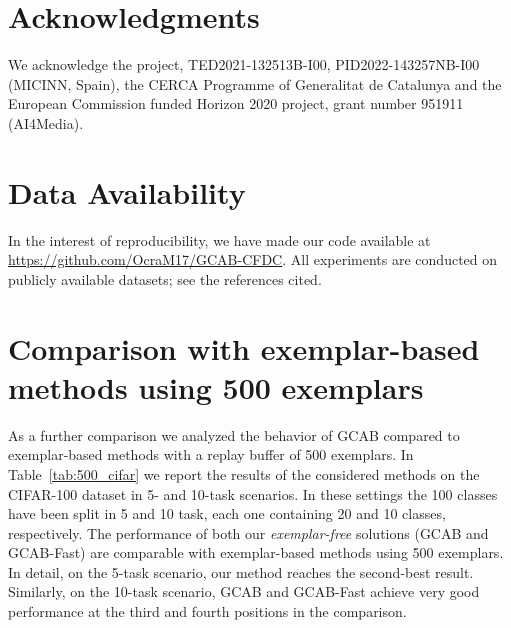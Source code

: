 \documentclass[twocolumn]{svjour3}          %
\begin{document}
\section*{Acknowledgments}
We acknowledge the project, TED2021-132513B-I00, PID2022-143257NB-I00 (MICINN, Spain), the CERCA Programme of Generalitat de Catalunya and the European Commission funded Horizon 2020 project, grant number 951911 (AI4Media). 

\section*{Data Availability}
In the interest of reproducibility, we have made our code available at \url{https://github.com/OcraM17/GCAB-CFDC}. All experiments are conducted on publicly available datasets; see the references cited.


%


\appendix


\section{Comparison with exemplar-based methods using 500 exemplars}
As a further comparison we analyzed the behavior of GCAB compared to exemplar-based methods with a replay buffer of 500 exemplars. In Table~\ref{tab:500_cifar} we report the results of the considered methods on the CIFAR-100 dataset in 5- and 10-task scenarios. In these settings the 100 classes have been split in 5 and 10 task, each one containing  20 and 10 classes, respectively. The performance of both our \textit{exemplar-free} solutions (GCAB and GCAB-Fast) are comparable with exemplar-based methods using 500 exemplars. In detail, on the 5-task scenario, our method reaches the second-best result. Similarly, on the 10-task scenario, GCAB and GCAB-Fast achieve very good performance at the third and fourth positions in the comparison.
\end{document}

